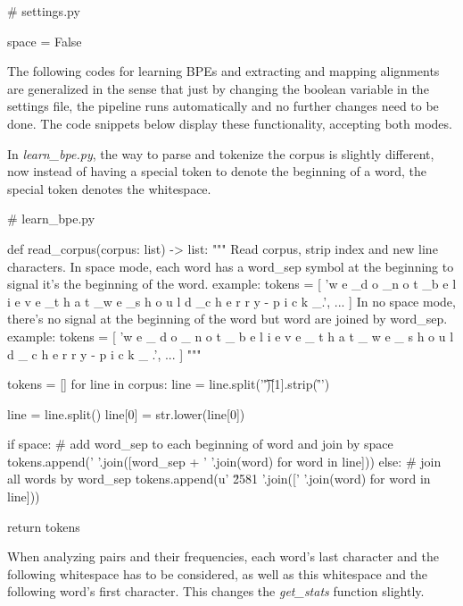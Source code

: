 \begin{python}
# settings.py

space = False
\end{python}

The following codes for learning BPEs and extracting and mapping alignments are generalized in the sense that just by changing the boolean variable in the settings file, the pipeline runs automatically and no further changes need to be done. The code snippets below display these functionality, accepting both modes.

In \emph{learn\_bpe.py}, the way to parse and tokenize the corpus is slightly different, now instead of having a special token to denote the beginning of a word, the special token denotes the whitespace.

\begin{python}
# learn_bpe.py

def read_corpus(corpus: list) -> list:
  """
  Read corpus, strip index and new line characters.
  In space mode, each word has a word_sep symbol at the beginning to signal it's the beginning of the word.
  example:
  tokens = [
      'w e \_d o \_n o t \_b e l i e v e \_t h a t \_w e \_s h o u l d \_c h e r r y - p i c k \_.',
      ...
  ]
  In no space mode, there's no signal at the beginning of the word but word are joined by word_sep.
  example:
  tokens = [
      'w e \_ d o \_ n o t \_ b e l i e v e \_ t h a t \_ w e \_ s h o u l d \_ c h e r r y - p i c k \_ .',
      ...
  ]
  """

  tokens = []
  for line in corpus:
    line = line.split('\t')[1].strip('\r\n ')

    line = line.split()
    line[0] = str.lower(line[0])

    if space:
      # add word_sep to each beginning of word and join by space
      tokens.append(' '.join([word_sep + ' '.join(word) for word in line]))
    else:
      # join all words by word_sep
      tokens.append(u' \u2581 '.join([' '.join(word) for word in line]))

  return tokens
\end{python}

When analyzing pairs and their frequencies, each word's last character and the following whitespace has to be considered, as well as this whitespace and the following word's first character. This changes the \emph{get\_stats} function slightly.

